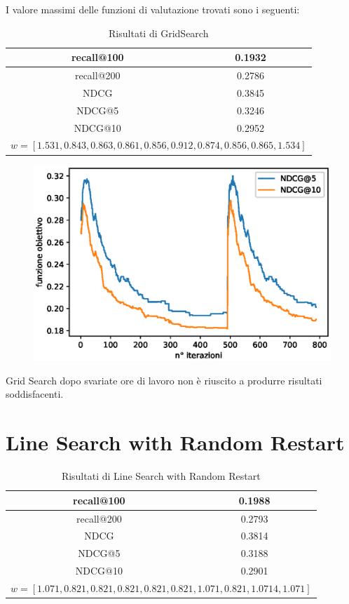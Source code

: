 I valore massimi delle funzioni di valutazione trovati
sono i seguenti:

\begin{table}[h!]
	\centering
	\begin{tabular}{|c|c|}
		\hline 
		recall@100  &  0.1932  \\
		\hline
		recall@200   & 0.2786 \\
		\hline
		NDCG    & 0.3845 \\
		\hline
		NDCG@5  & 0.3246 \\
		\hline
		NDCG@10  & 0.2952 \\
		\hline
		\multicolumn{2}{|c|}{$w = [1.531, 0.843, 0.863, 0.861, 0.856 , 0.912, 0.874, 0.856, 0.865, 1.534]$} \\
		\hline
	\end{tabular}
	\caption{Risultati di GridSearch}
\end{table}

\begin{figure}[h!]
	\centering
	\includegraphics[width=0.7\linewidth]{figure/gs_search}
	\caption[Andamento della funzione obiettivo utilizzando GridSearch]{}
	\label{fig:gssearch}
\end{figure}


Grid Search dopo svariate ore di lavoro non è riuscito a produrre risultati soddisfacenti.

\section{Line Search with Random Restart}

\begin{table}[h!]
	\centering
	\begin{tabular}{|c|c|}
		\hline
		recall@100 &  0.1988 \\
		\hline
		recall@200 & 0.2793  \\
		\hline
		NDCG & 0.3814 \\
		\hline
		NDCG@5 & 0.3188 \\
		\hline
		NDCG@10 & 0.2901 \\
		\hline
		\multicolumn{2}{|c|}{
			$w = [1.071, 0.821, 0.821, 0.821, 0.821, 0.821, 1.071, 0.821, 1.0714, 1.071]$ 
		} \\
	\hline
	\end{tabular}
	\caption{Risultati di Line Search with Random Restart}
\end{table}

